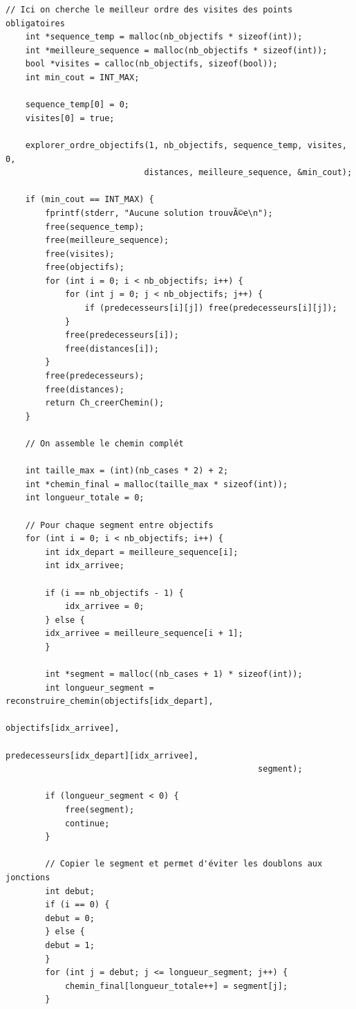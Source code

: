 \begin{lstlisting}[caption={Ch\_genererCheminOptimal}]
    // Ici on cherche le meilleur ordre des visites des points obligatoires
    int *sequence_temp = malloc(nb_objectifs * sizeof(int));
    int *meilleure_sequence = malloc(nb_objectifs * sizeof(int));
    bool *visites = calloc(nb_objectifs, sizeof(bool));
    int min_cout = INT_MAX;
    
    sequence_temp[0] = 0; 
    visites[0] = true;
    
    explorer_ordre_objectifs(1, nb_objectifs, sequence_temp, visites, 0,
                            distances, meilleure_sequence, &min_cout);
    
    if (min_cout == INT_MAX) {
        fprintf(stderr, "Aucune solution trouvÃ©e\n");
        free(sequence_temp);
        free(meilleure_sequence);
        free(visites);
        free(objectifs);
        for (int i = 0; i < nb_objectifs; i++) {
            for (int j = 0; j < nb_objectifs; j++) {
                if (predecesseurs[i][j]) free(predecesseurs[i][j]);
            }
            free(predecesseurs[i]);
            free(distances[i]);
        }
        free(predecesseurs);
        free(distances);
        return Ch_creerChemin();
    }
    
    // On assemble le chemin complét
    
    int taille_max = (int)(nb_cases * 2) + 2;
    int *chemin_final = malloc(taille_max * sizeof(int));
    int longueur_totale = 0;
    
    // Pour chaque segment entre objectifs
    for (int i = 0; i < nb_objectifs; i++) {
        int idx_depart = meilleure_sequence[i];
        int idx_arrivee;

        if (i == nb_objectifs - 1) {
            idx_arrivee = 0;
        } else {
        idx_arrivee = meilleure_sequence[i + 1];
        } 
        
        int *segment = malloc((nb_cases + 1) * sizeof(int));
        int longueur_segment = reconstruire_chemin(objectifs[idx_depart],
                                                   objectifs[idx_arrivee],
                                                   predecesseurs[idx_depart][idx_arrivee],
                                                   segment);
        
        if (longueur_segment < 0) {
            free(segment);
            continue;
        }
        
        // Copier le segment et permet d'éviter les doublons aux jonctions
        int debut;
        if (i == 0) {
        debut = 0;
        } else {
        debut = 1;
        }
        for (int j = debut; j <= longueur_segment; j++) {
            chemin_final[longueur_totale++] = segment[j];
        }
        

\end{lstlisting}
